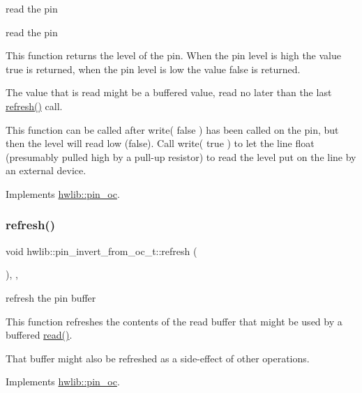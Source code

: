 read the pin

read the pin

This function returns the level of the pin. When the pin level is high the value true is returned, when the pin level is low the value false is returned.

The value that is read might be a buffered value, read no later than the last \hyperlink{classhwlib_1_1pin__invert__from__oc__t_ab2394ce2e52a3dd16a22663436d000f7}{refresh()} call.

This function can be called after write( false ) has been called on the pin, but then the level will read low (false). Call write( true ) to let the line float (presumably pulled high by a pull-\/up resistor) to read the level put on the line by an external device. 

Implements \hyperlink{classhwlib_1_1pin__oc_a51180afd605add59b96105fa98e29f88}{hwlib\+::pin\+\_\+oc}.

\mbox{\label{classhwlib_1_1pin__invert__from__oc__t_ab2394ce2e52a3dd16a22663436d000f7}} 
\subsubsection{\texorpdfstring{refresh()}{refresh()}}
{\footnotesize\ttfamily void hwlib\+::pin\+\_\+invert\+\_\+from\+\_\+oc\+\_\+t\+::refresh (\begin{DoxyParamCaption}{ }\end{DoxyParamCaption})\hspace{0.3cm}{\ttfamily [inline]}, {\ttfamily [override]}, {\ttfamily [virtual]}}





refresh the pin buffer

This function refreshes the contents of the read buffer that might be used by a buffered \hyperlink{classhwlib_1_1pin__invert__from__oc__t_a650ed38934b4585f42c756edd19b9c67}{read()}.

That buffer might also be refreshed as a side-\/effect of other operations. 

Implements \hyperlink{classhwlib_1_1pin__oc_a573740f6f790c5792efc9cdd44cc73b3}{hwlib\+::pin\+\_\+oc}.

